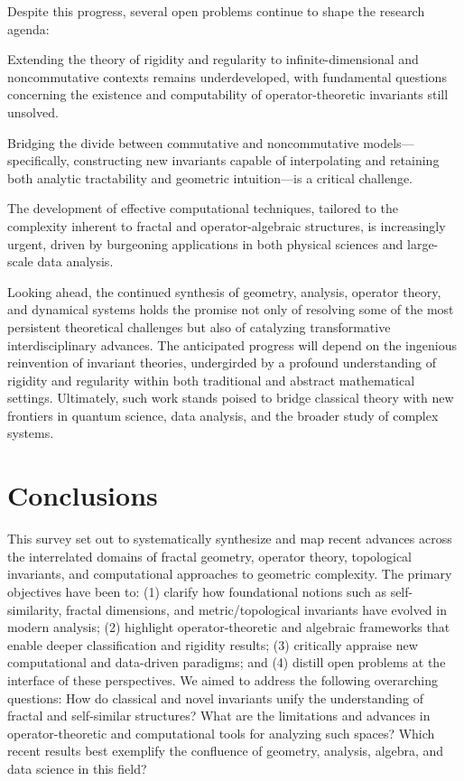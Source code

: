 \documentclass[sigconf]{acmart}
\begin{document}
Despite this progress, several open problems continue to shape the research agenda:

Extending the theory of rigidity and regularity to infinite-dimensional and noncommutative contexts remains underdeveloped, with fundamental questions concerning the existence and computability of operator-theoretic invariants still unsolved.

Bridging the divide between commutative and noncommutative models—specifically, constructing new invariants capable of interpolating and retaining both analytic tractability and geometric intuition—is a critical challenge.

The development of effective computational techniques, tailored to the complexity inherent to fractal and operator-algebraic structures, is increasingly urgent, driven by burgeoning applications in both physical sciences and large-scale data analysis.

Looking ahead, the continued synthesis of geometry, analysis, operator theory, and dynamical systems holds the promise not only of resolving some of the most persistent theoretical challenges but also of catalyzing transformative interdisciplinary advances. The anticipated progress will depend on the ingenious reinvention of invariant theories, undergirded by a profound understanding of rigidity and regularity within both traditional and abstract mathematical settings. Ultimately, such work stands poised to bridge classical theory with new frontiers in quantum science, data analysis, and the broader study of complex systems.

\section{Conclusions}

This survey set out to systematically synthesize and map recent advances across the interrelated domains of fractal geometry, operator theory, topological invariants, and computational approaches to geometric complexity. The primary objectives have been to: (1) clarify how foundational notions such as self-similarity, fractal dimensions, and metric/topological invariants have evolved in modern analysis; (2) highlight operator-theoretic and algebraic frameworks that enable deeper classification and rigidity results; (3) critically appraise new computational and data-driven paradigms; and (4) distill open problems at the interface of these perspectives. We aimed to address the following overarching questions: How do classical and novel invariants unify the understanding of fractal and self-similar structures? What are the limitations and advances in operator-theoretic and computational tools for analyzing such spaces? Which recent results best exemplify the confluence of geometry, analysis, algebra, and data science in this field?
\end{document}

